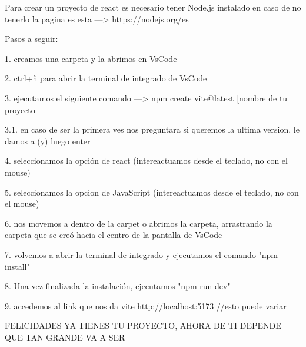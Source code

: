 Para crear un proyecto de react es necesario tener Node.js instalado
en caso de no tenerlo la pagina es esta ---> https://nodejs.org/es

Pasos a seguir:

1. creamos una carpeta y la abrimos en VsCode

2. ctrl+ñ para abrir la terminal de integrado de VsCode

3. ejecutamos el siguiente comando ---> npm create vite@latest [nombre de tu proyecto]

3.1. en caso de ser la primera ves nos preguntara si queremos la ultima 
version, le damos a (y) luego enter


4. seleccionamos la opción de react (intereactuamos desde el teclado, no con el mouse)

5. seleccionamos la opcion de JavaScript (intereactuamos desde el teclado, no con el mouse)


6. nos movemos a dentro de la carpet o abrimos la carpeta, arrastrando la carpeta que se creó hacia el centro de la pantalla de VsCode

7. volvemos a abrir la terminal de integrado y ejecutamos el comando "npm install"

8. Una vez finalizada la instalación, ejecutamos "npm run dev" 

9. accedemos al link que nos da vite http://localhost:5173 //esto puede variar
    

FELICIDADES YA TIENES TU PROYECTO, AHORA DE TI DEPENDE QUE TAN GRANDE VA A SER